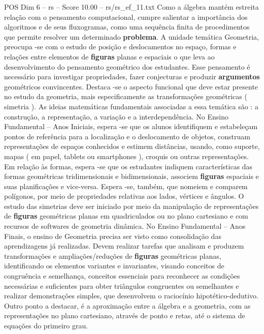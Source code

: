 \begin{textsample}{POS Dim 6 – rs – Score 10.00 – rs/rs\_ef\_11.txt}
Como a álgebra mantém estreita relação com o pensamento computacional, cumpre salientar a importância dos algoritmos e de seus fluxogramas, como uma sequência finita de procedimentos que permite resolver um determinado \textbf{problema}.
A unidade temática Geometria, preocupa -se com o estudo de posição e deslocamentos no espaço, formas e relações entre elementos de \textbf{figuras} planas e espaciais o que leva ao desenvolvimento do pensamento geométrico dos estudantes.
Esse pensamento é necessário para investigar propriedades, fazer conjecturas e produzir \textbf{argumentos} geométricos convincentes.
Destaca -se o aspecto funcional que deve estar presente no estudo da geometria, mais especificamente as transformações geométricas ( simetria ).
As ideias matemáticas fundamentais associadas a essa temática são : a construção, a representação, a variação e a interdependência.
No Ensino Fundamental – Anos Iniciais, espera -se que os alunos identifiquem e estabeleçam pontos de referência para a localização e o deslocamento de objetos, construam representações de espaços conhecidos e estimem distâncias, usando, como suporte, mapas ( em papel, tablets ou smartphones ), croquis ou outras representações.
Em relação às formas, espera -se que os estudantes indiquem características das formas geométricas tridimensionais e bidimensionais, associem \textbf{figuras} espaciais e suas planificações e vice-versa.
Espera -se, também, que nomeiem e comparem polígonos, por meio de propriedades relativas aos lados, vértices e ângulos.
O estudo das simetrias deve ser iniciado por meio da manipulação de representações de \textbf{figuras} geométricas planas em quadriculados ou no plano cartesiano e com recursos de softwares de geometria dinâmica.
No Ensino Fundamental – Anos Finais, o ensino de Geometria precisa ser visto como consolidação das aprendizagens já realizadas.
Devem realizar tarefas que analisam e produzem transformações e ampliações/reduções de \textbf{figuras} geométricas planas, identificando os elementos variantes e invariantes, visando conceitos de congruência e semelhança, conceitos essenciais para reconhecer as condições necessárias e suficientes para obter triângulos congruentes ou semelhantes e realizar demonstrações simples, que desenvolvem o raciocínio hipotético-dedutivo.
Outro ponto a destacar, é a aproximação entre a álgebra e a geometria, com as representações no plano cartesiano, através de ponto e retas, até o sistema de equações do primeiro grau.

\end{textsample}
